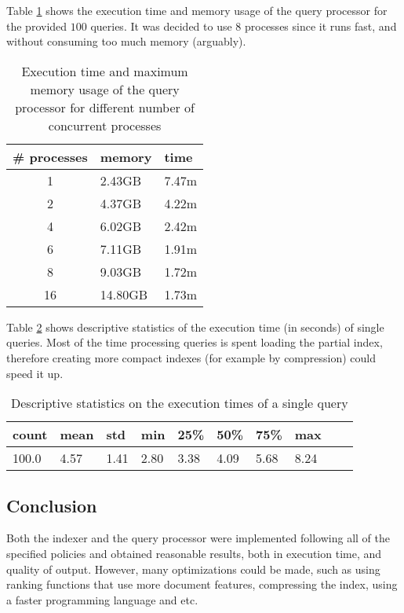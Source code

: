 \documentclass[sigconf,authorversion,nonacm]{acmart}
\begin{document}
Table \ref{tab:query:time} shows the execution time and memory usage of the query processor for the provided $100$ queries. It was decided to use $8$ processes since it runs fast, and without consuming too much memory (arguably).

\begin{table}[H]
  \caption{Execution time and maximum memory usage of the query processor for different number of concurrent processes}
  \label{tab:query:time}
  \begin{tabular}{cll}
    \# processes & memory  & time  \\
    \toprule
    1            & 2.43GB  & 7.47m \\
    2            & 4.37GB  & 4.22m \\
    4            & 6.02GB  & 2.42m \\
    6            & 7.11GB  & 1.91m \\
    8            & 9.03GB  & 1.72m \\
    16           & 14.80GB & 1.73m \\
    \bottomrule
  \end{tabular}
\end{table}

Table \ref{tab:query:qtime} shows descriptive statistics of the execution time (in seconds) of single queries. Most of the time processing queries is spent loading the partial index, therefore creating more compact indexes (for example by compression) could speed it up.

\begin{table}[H]
  \caption{Descriptive statistics on the execution times of a single query}
  \label{tab:query:qtime}
  \begin{tabular}{llllllllll}
    count & mean & std  & min  & 25\% & 50\% & 75\% & max  \\
    \toprule
    100.0 & 4.57 & 1.41 & 2.80 & 3.38 & 4.09 & 5.68 & 8.24 \\
    \bottomrule
  \end{tabular}
\end{table}

\subsection{Conclusion}

Both the indexer and the query processor were implemented following all of the specified policies and obtained reasonable results, both in execution time, and quality of output. However, many optimizations could be made, such as using ranking functions that use more document features, compressing the index, using a faster programming language and etc.
\end{document}

